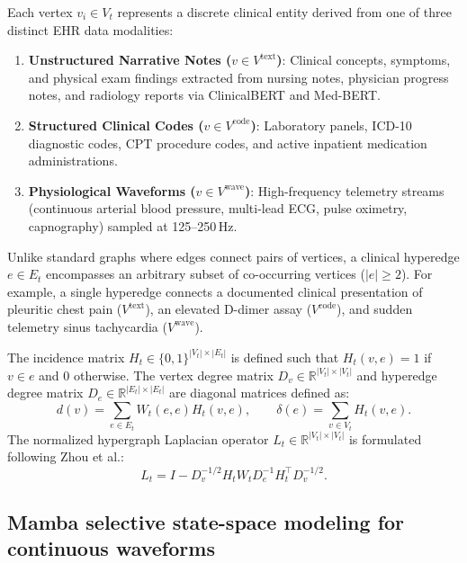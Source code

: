 \documentclass[12pt]{article}
\newcommand{\R}{\mathbb{R}}
\begin{document}
Each vertex $v_i \in V_t$ represents a discrete clinical entity derived from one of three distinct EHR data modalities:
\begin{enumerate}
  \item \textbf{Unstructured Narrative Notes ($v \in V^{\text{text}}$)}: Clinical concepts, symptoms, and physical exam findings extracted from nursing notes, physician progress notes, and radiology reports via ClinicalBERT\cite{huang2019clinicalbert} and Med-BERT\cite{rasmy2021medbert}.
  \item \textbf{Structured Clinical Codes ($v \in V^{\text{code}}$)}: Laboratory panels, ICD-10 diagnostic codes, CPT procedure codes, and active inpatient medication administrations.
  \item \textbf{Physiological Waveforms ($v \in V^{\text{wave}}$)}: High-frequency telemetry streams (continuous arterial blood pressure, multi-lead ECG, pulse oximetry, capnography) sampled at 125--250\,Hz.
\end{enumerate}

Unlike standard graphs where edges connect pairs of vertices, a clinical hyperedge $e \in E_t$ encompasses an arbitrary subset of co-occurring vertices ($|e| \ge 2$). For example, a single hyperedge connects a documented clinical presentation of pleuritic chest pain ($V^{\text{text}}$), an elevated D-dimer assay ($V^{\text{code}}$), and sudden telemetry sinus tachycardia ($V^{\text{wave}}$).

The incidence matrix $H_t \in \{0, 1\}^{|V_t| \times |E_t|}$ is defined such that $H_t(v, e) = 1$ if $v \in e$ and $0$ otherwise. The vertex degree matrix $D_v \in \R^{|V_t| \times |V_t|}$ and hyperedge degree matrix $D_e \in \R^{|E_t| \times |E_t|}$ are diagonal matrices defined as:
\begin{equation}
  d(v) = \sum_{e \in E_t} W_t(e, e) H_t(v, e), \qquad \delta(e) = \sum_{v \in V_t} H_t(v, e).
\end{equation}
The normalized hypergraph Laplacian operator $L_t \in \R^{|V_t| \times |V_t|}$ is formulated following Zhou et al.\cite{zhou2006learning}:
\begin{equation}
  L_t = I - D_v^{-1/2} H_t W_t D_e^{-1} H_t^\top D_v^{-1/2}.
  \label{eq:hypergraph_laplacian}
\end{equation}

\subsection*{Mamba selective state-space modeling for continuous waveforms}
\end{document}
